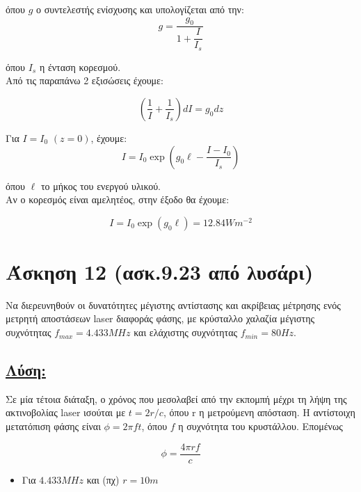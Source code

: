 \documentclass[a4paper,11pt,titlepage]{article}
\numberwithin{equation}{section} %
\begin{document}
όπου $g$ ο συντελεστής ενίσχυσης και υπολογίζεται από την:
\begin{equation}
 g=\frac{g_0}{1+\dfrac{I}{I_s}}
\end{equation}

όπου $I_s$ η ένταση κορεσμού.
\\
Από τις παραπάνω 2 εξισώσεις έχουμε:

\begin{equation}
(\dfrac{1}{I}+\dfrac{1}{I_s})dI=g_0dz
\end{equation}

Για $I=I_0$ $(z=0)$, έχουμε:
\begin{equation}
 I=I_0\exp ( g_0\ell-\dfrac{I-I_0}{I_s} )
\end{equation}

όπου $\ell$ το μήκος του ενεργού υλικού. \\
Αν ο κορεσμός είναι αμελητέος, στην έξοδο θα έχουμε:

\begin{equation}
 I=I_0\exp(g_0\ell)=12.84Wm^{-2}
\end{equation}


\section{Άσκηση 12 (ασκ.9.23 από λυσάρι)}

Να διερευνηθούν οι δυνατότητες μέγιστης αντίστασης και ακρίβειας μέτρησης ενός μετρητή αποστάσεων laser διαφοράς φάσης, με κρύσταλλο χαλαζία μέγιστης συχνότητας $f_{max}=4.433MHz$ και ελάχιστης συχνότητας $f_{min}=80Hz$.

\subsection*{\underline{Λύση:}}

Σε μία τέτοια διάταξη, ο χρόνος που μεσολαβεί από την εκπομπή μέχρι τη λήψη της ακτινοβολίας laser ισούται με $t=2r/c$, όπου r η μετρούμενη απόσταση. Η αντίστοιχη μετατόπιση φάσης είναι $\phi=2\pi ft$, όπου $f$ η συχνότητα του κρυστάλλου. Επομένως

\begin{equation}
 \phi= \frac{4\pi rf}{c}
\end{equation}

\begin{itemize}
 \item Για $4.433MHz$ και (πχ) $r=10m$
\end{itemize}
\end{document}
